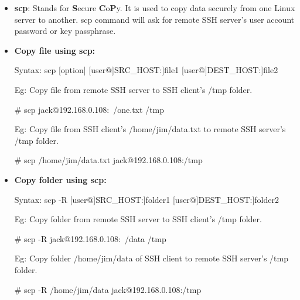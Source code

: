 \setlength{\columnsep}{3pt}
\begin{flushleft}

\begin{itemize}
	\item \textbf{scp}: Stands for \textbf{S}ecure \textbf{C}o\textbf{P}y. It is used to copy data securely from one Linux server to another.
	\newline
	scp command will ask for remote SSH server's user account password or key passphrase.
	\bigskip
		
	\item \textbf{Copy file using scp:}
	\begin{tcolorbox}[breakable,notitle,boxrule=0pt,colback=pink,colframe=pink]
		\color{black}

		Syntax: scp [option] [user@]SRC\_HOST:]file1 [user@]DEST\_HOST:]file2

	\end{tcolorbox}
	
	\bigskip
	
	Eg: Copy file from remote SSH server to SSH client's /tmp folder.
	\begin{tcolorbox}[breakable,notitle,boxrule=-0pt,colback=black,colframe=black]
		\color{green}
		\font=9pt
		\# scp jack@192.168.0.108:~/one.txt  /tmp
		\font=4pt
	\end{tcolorbox}

	\bigskip
	
	Eg: Copy file from SSH client's /home/jim/data.txt to remote SSH server's /tmp folder.
	\begin{tcolorbox}[breakable,notitle,boxrule=-0pt,colback=black,colframe=black]
		\color{green}
		\font=9pt
		\# scp  /home/jim/data.txt  jack@192.168.0.108:/tmp
		\font=4pt
	\end{tcolorbox}

	\item \textbf{Copy folder using scp:}
	\begin{tcolorbox}[breakable,notitle,boxrule=0pt,colback=pink,colframe=pink]
		\color{black}
		\font=9pt
		Syntax: scp -R [user@]SRC\_HOST:]folder1 [user@]DEST\_HOST:]folder2
		\font=4pt
	\end{tcolorbox}

	\bigskip

	Eg: Copy folder from remote SSH server to SSH client's /tmp folder.
	\begin{tcolorbox}[breakable,notitle,boxrule=-0pt,colback=black,colframe=black]
		\color{green}
		\font=9pt
		\# scp -R jack@192.168.0.108:~/data  /tmp
		\font=4pt
	\end{tcolorbox}
	
	\bigskip
	Eg: Copy folder /home/jim/data of SSH client to remote SSH server's /tmp folder.
	\begin{tcolorbox}[breakable,notitle,boxrule=-0pt,colback=black,colframe=black]
		\color{green}
		\font=9pt
		\# scp -R /home/jim/data  jack@192.168.0.108:/tmp
		\font=4pt
	\end{tcolorbox}
		
\end{itemize}

\end{flushleft}
\newpage


